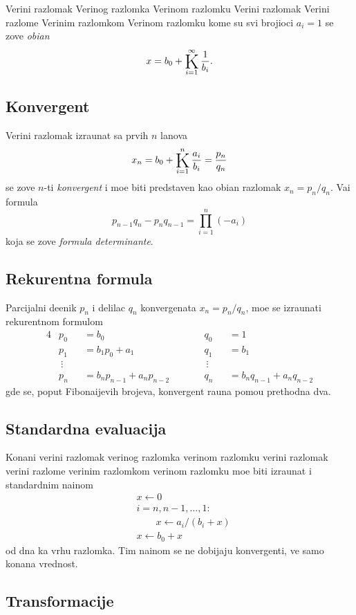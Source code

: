 \documentclass[12pt, twoside, a4paper]{article}
\def\vr#1{\ifcase#1\relax\or
  ve\-ri{\zv}\-ni raz\-lo\-mak\or
  ve\-ri{\zv}\-nog raz\-lom\-ka\or
  ve\-ri{\zv}\-nom raz\-lom\-ku\or
  ve\-ri{\zv}\-ni raz\-lo\-mak\or
  ve\-ri{\zv}\-ni raz\-lom\-{\cv}e\or
  ve\-ri{\zv}\-nim raz\-lom\-kom\or
  ve\-ri{\zv}\-nom raz\-lom\-ku\fi}
\def\Vr#1{\ifcase#1\relax\or
  Ve\-ri{\zv}\-ni raz\-lo\-mak\or
  Ve\-ri{\zv}\-nog raz\-lom\-ka\or
  Ve\-ri{\zv}\-nom raz\-lom\-ku\or
  Ve\-ri{\zv}\-ni raz\-lo\-mak\or
  Ve\-ri{\zv}\-ni raz\-lom\-{\cv}e\or
  Ve\-ri{\zv}\-nim raz\-lom\-kom\or
  Ve\-ri{\zv}\-nom raz\-lom\-ku\fi}
\def\A{p} \def\B{q}
\begin{document}
\medskip

\Vr1 kome su svi brojioci $a_i=1$ se zove {\sl obi{\cv}an}
$$
x=b_0+\Kinf1{b_i}.
$$

\subsection{Konvergent}

Veri{\zv}ni razlomak izra{\cv}unat sa prvih $n$ {\cv}lanova
$$
x_n=b_0+\Ki^n{a_i\over b_i}={\A_n\over \B_n}
$$
se zove $n$-ti {\sl konvergent} i mo{\zv}e biti predstav{\lj}en kao obi{\cv}an razlomak $x_n=\A_n/\B_n$.
Va{\zv}i formula
$$
\A_{n-1} \B_n - \A_n \B_{n-1} = \prod_{i=1}^n(-a_i)
$$
koja se zove {\sl formula determinante}.


\subsection{Rekurentna formula}

Parcijalni de{\lj}enik $p_n$ i delilac $q_n$ konvergenata $x_n=\A_n/\B_n$, mo{\zv}e se izra{\cv}unati
re\-ku\-rent\-nom formulom
\begin{alignat*}{4}
&\A_0&&=b_0&&\B_0&&=1\\
&\A_1&&=b_1p_0+a_1&&\B_1&&=b_1\\
&\>\vdots&&&&\>\vdots\\
&\A_n&&=b_n\A_{n-1}+a_n\A_{n-2}\qquad&&\B_n&&=b_n\B_{n-1}+a_n\B_{n-2}
\end{alignat*}
gde se, poput Fibona{\cv}ijevih brojeva, konvergent ra{\cv}una pomo{\cc}u prethodna dva.

\subsection{Standardna evaluacija}

Kona{\cv}ni \vr1 mo{\zv}e biti izra{\cv}unat i standardnim na{\cv}inom
\begin{align*}
&x\leftarrow0\\
&i=n,n-1,\ldots,1:\\
&\qquad x\leftarrow a_i/(b_i+x)\\
&x\leftarrow b_0+x
\end{align*}
od dna ka vrhu razlomka. Tim na{\cv}inom se ne dobijaju konvergenti, ve{\cc} samo kona{\cv}na vrednost.

\subsection{Transformacije}
\end{document}

